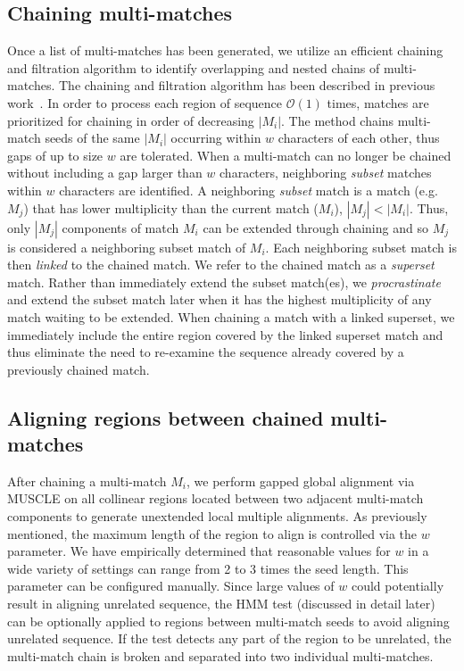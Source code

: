 \documentclass[12pt,journal,letterpaper,onecolumn, draftcls]{IEEEtran}
\begin{document}
\subsection{Chaining multi-matches}
Once a list of multi-matches has been generated, we utilize an
efficient chaining and filtration algorithm to identify overlapping
and nested chains of multi-matches.  The chaining and filtration algorithm has been described in previous work~\cite{ref-procrast}. In order to
process each region of sequence $\mathcal{O}(1)$ times, matches
are prioritized for chaining in order of decreasing $|M_i|$.  The
method chains multi-match seeds of the same $|M_i|$
occurring within $w$ characters of each other, thus gaps of up to size
$w$ are tolerated.  When a multi-match can
no longer be chained without including a gap larger than $w$
characters, neighboring \textit{subset} matches within $w$ characters
are identified. A neighboring \textit{subset} match is a match (e.g. $M_j$) that has lower multiplicity
than the current match ($M_i$), $|M_j| < |M_i|$. Thus, only $|M_j|$ components of match $M_i$ can be extended through
chaining and so $M_j$ is considered a neighboring subset match of $M_i$. Each neighboring subset match is then \textit{linked}
to the chained match. We refer to the chained match as a
\textit{superset} match. Rather than immediately extend the subset
match(es), we \textit{procrastinate} and extend the subset match later
when it has the highest multiplicity of any match waiting to be
extended. When chaining a match with a linked superset, we immediately
include the entire region covered by the linked superset match and
thus eliminate the need to re-examine the sequence already covered by a
previously chained match.

\subsection{Aligning regions between chained multi-matches}
After chaining a multi-match $M_i$, we perform gapped global alignment via MUSCLE on all
collinear regions located between two adjacent multi-match components to generate
unextended local multiple alignments. As previously mentioned, the maximum length of the region to align
is controlled via the $w$ parameter. We have empirically determined that reasonable values
for $w$ in a wide variety of settings can range from 2 to 3 times the seed length. This
parameter can be configured manually. Since large values of
$w$ could potentially result in aligning unrelated sequence, the HMM test (discussed in detail later) can be optionally applied
to regions between multi-match seeds to avoid aligning unrelated sequence. If the test detects any part of the
region to be unrelated, the multi-match chain is broken and separated into two individual multi-matches.
\end{document}
